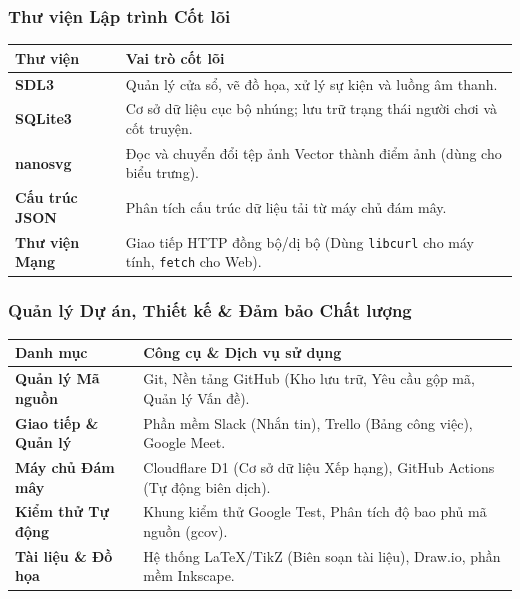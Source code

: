 \documentclass[12pt,a4paper]{article}
\begin{document}
\subsubsection{Thư viện Lập trình Cốt lõi}
\begin{center}
\begin{adjustbox}{max width=\linewidth}
\begin{tabular}{|p{3cm}|p{11.5cm}|}
\hline
{}
\textbf{Thư viện} & \textbf{Vai trò cốt lõi} \\
\hline
\textbf{SDL3} & Quản lý cửa sổ, vẽ đồ họa, xử lý sự kiện và luồng âm thanh. \\
\hline
\textbf{SQLite3} & Cơ sở dữ liệu cục bộ nhúng; lưu trữ trạng thái người chơi và cốt truyện. \\
\hline
\textbf{nanosvg} & Đọc và chuyển đổi tệp ảnh Vector thành điểm ảnh (dùng cho biểu trưng). \\
\hline
\textbf{Cấu trúc JSON} & Phân tích cấu trúc dữ liệu tải từ máy chủ đám mây. \\
\hline
\textbf{Thư viện Mạng} & Giao tiếp HTTP đồng bộ/dị bộ (Dùng \texttt{libcurl} cho máy tính, \texttt{fetch} cho Web). \\
\hline
\end{tabular}
\end{adjustbox}
\end{center}

\subsubsection{Quản lý Dự án, Thiết kế \& Đảm bảo Chất lượng}
\begin{center}
\begin{adjustbox}{max width=\linewidth}
\begin{tabular}{|p{3.5cm}|p{11cm}|}
\hline
\rowcolor{gray!20}
\textbf{Danh mục} & \textbf{Công cụ \& Dịch vụ sử dụng} \\
\hline
\textbf{Quản lý Mã nguồn} & Git, Nền tảng GitHub (Kho lưu trữ, Yêu cầu gộp mã, Quản lý Vấn đề). \\
\hline
\textbf{Giao tiếp \& Quản lý} & Phần mềm Slack (Nhắn tin), Trello (Bảng công việc), Google Meet. \\
\hline
\textbf{Máy chủ Đám mây} & Cloudflare D1 (Cơ sở dữ liệu Xếp hạng), GitHub Actions (Tự động biên dịch). \\
\hline
\textbf{Kiểm thử Tự động} & Khung kiểm thử Google Test, Phân tích độ bao phủ mã nguồn (gcov). \\
\hline
\textbf{Tài liệu \& Đồ họa} & Hệ thống LaTeX/TikZ (Biên soạn tài liệu), Draw.io, phần mềm Inkscape. \\
\hline
\end{tabular}
\end{adjustbox}
\end{center}
\end{document}
